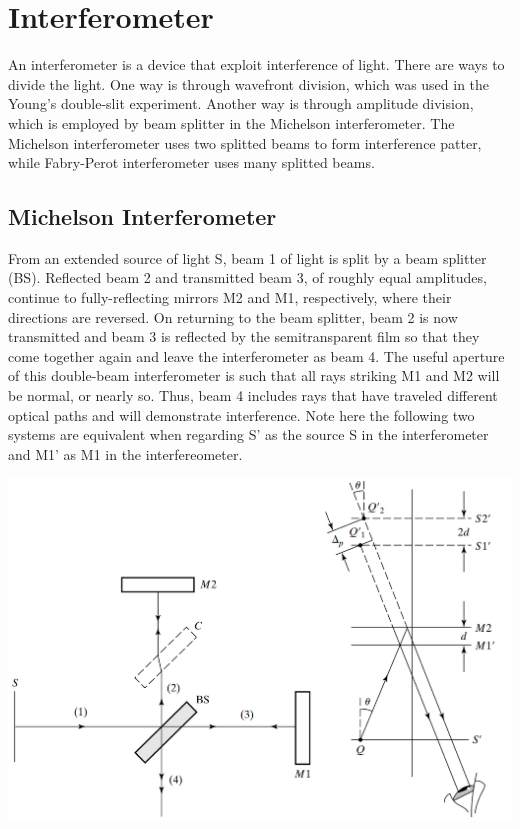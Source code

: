 \documentclass[11pt]{book}
\theoremstyle{break}
\theoremstyle{break}
\begin{document}
\newpage
\chapter{Interferometer}
An interferometer is a device that exploit interference of light. There are ways to divide the light. One way is through wavefront division, which was used in the Young's double-slit experiment. Another way is through amplitude division, which is employed by beam splitter in the Michelson interferometer. The Michelson interferometer uses two splitted beams to form interference patter, while Fabry-Perot interferometer uses many splitted beams. 
\section[Michelson Interferometer]{\color{red}Michelson Interferometer\color{black}}
From an extended source of light S, beam 1 of light is split by a beam splitter
(BS). Reflected beam 2 and transmitted beam 3, of roughly equal amplitudes, continue to fully-reflecting mirrors M2 and M1, respectively, where their directions are reversed. On returning to the beam splitter, beam 2 is now transmitted and beam 3 is reflected by the semitransparent film so that they come together again and leave the interferometer as beam 4. The useful aperture of this double-beam interferometer is such that all rays striking M1 and M2 will be normal, or nearly so. Thus, beam 4 includes rays that have traveled different optical paths and will demonstrate interference. Note here the following two systems are equivalent when regarding S' as the source S in the interferometer and M1' as M1 in the interfereometer. 
\begin{center}
\includegraphics[scale=0.55]{Michelson.png}
\end{center}
\end{document}
